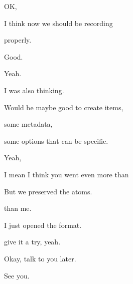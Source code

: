 \documentclass[11pt,a4paper]{article}
\begin{document}
OK,

I think now we should be recording

properly.

Good.

Yeah.

I was also thinking.

Would be maybe good to create items,

some metadata,

some options that can be specific.

Yeah,

I mean I think you went even more than

But we preserved the atoms.

than me.

I just opened the format.

give it a try, yeah.

Okay, talk to you later.

See you.
\end{document}
